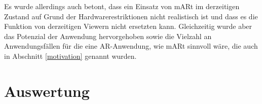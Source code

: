 Es wurde allerdings auch betont, dass ein Einsatz von mARt im derzeitigen Zustand auf Grund der Hardwarerestriktionen nicht realistisch ist und dass es die Funktion von derzeitigen Viewern nicht ersetzten kann. Gleichzeitig wurde aber das Potenzial der Anwendung hervorgehoben sowie die Vielzahl an Anwendungsfällen für die eine AR-Anwendung, wie mARt sinnvoll wäre, die auch in Abschnitt \ref{motivation} genannt wurden. 

\section{Auswertung}
